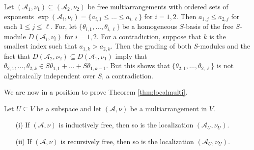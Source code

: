 \begin{remark}
\label{rem:multiexponents}
Let $({{\mathcal A}}_1, \nu_1) \subseteq ({{\mathcal A}}_2, \nu_2)$
be free multiarrangements with 
ordered sets of exponents
$\exp ({{\mathcal A}}_i, \nu_i) = \{a_{i,1} \le \ldots \le a_{i,\ell}\}$
for $i = 1,2$.
Then $a_{1,j} \le a_{2,j}$ for each $1 \le j \le \ell$.
For, let $\{\theta_{i,1}, \ldots ,\theta_{i,\ell}\}$ 
be a homogeneous $S$-basis
of the free $S$-module $D({{\mathcal A}}_i, \nu_i)$
for $i = 1,2$.
For a contradiction, suppose that $k$ is the 
smallest index such that $a_{1,k} > a_{2,k}$. 
Then the grading of both $S$-modules and the fact that 
$D({{\mathcal A}}_2, \nu_2) \subseteq D({{\mathcal A}}_1, \nu_1)$ imply that 
$\theta_{2,1}, \ldots, \theta_{2,k} \in S\theta_{1,1} + \ldots + S \theta_{1,k-1}$.
But this shows that $\{\theta_{2,1}, \ldots ,\theta_{2,\ell}\}$ is
not algebraically independent over $S$, a contradiction.
\end{remark}

We are now in a position to prove Theorem \ref{thm:localmulti}.

\begin{theorem}
\label{thm:multitwo}
Let $U \subseteq V$ be a subspace and let 
$({{\mathcal A}}, \nu)$ be a multiarrangement in $V$.
\begin{itemize}
\item[(i)] If $({{\mathcal A}}, \nu)$ is  inductively free,
then so is the localization $({{\mathcal A}}_U, \nu_U)$.
\item[(ii)] If $({{\mathcal A}}, \nu)$ is recursively free,
then so is the localization $({{\mathcal A}}_U, \nu_U)$.
\end{itemize}
\end{theorem}

